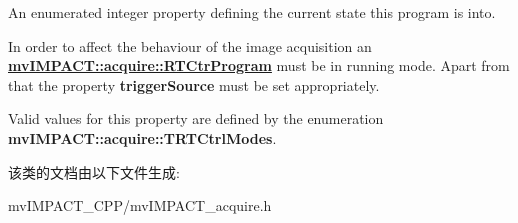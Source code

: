 An enumerated integer property defining the current state this program is into. 

In order to affect the behaviour of the image acquisition an {\bfseries \hyperlink{classmv_i_m_p_a_c_t_1_1acquire_1_1_r_t_ctr_program}{mv\+I\+M\+P\+A\+C\+T\+::acquire\+::\+R\+T\+Ctr\+Program}} must be in running mode. Apart from that the property {\bfseries trigger\+Source} must be set appropriately.

Valid values for this property are defined by the enumeration {\bfseries mv\+I\+M\+P\+A\+C\+T\+::acquire\+::\+T\+R\+T\+Ctrl\+Modes}. 

该类的文档由以下文件生成\+:\begin{DoxyCompactItemize}
\item 
mv\+I\+M\+P\+A\+C\+T\+\_\+\+C\+P\+P/mv\+I\+M\+P\+A\+C\+T\+\_\+acquire.\+h\end{DoxyCompactItemize}
